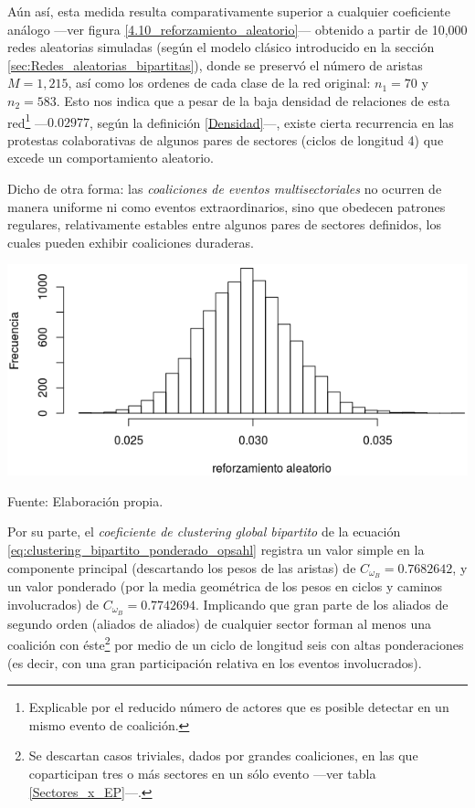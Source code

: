 \documentclass[letterpaper, 11pt]{book}
\theoremstyle{definition}
\theoremstyle{remark}
\begin{document}
Aún así, esta medida resulta comparativamente superior a cualquier coeficiente análogo ---ver figura \ref{4.10_reforzamiento_aleatorio}--- obtenido a partir de 10,000 redes aleatorias simuladas (según el modelo clásico introducido en la sección \ref{sec:Redes_aleatorias_bipartitas}), donde se preservó el número de aristas $M=1,215$, así como los ordenes de cada clase de la red original: $n_{1}=70$ y $n_{2}=583$. 
Esto nos indica que a pesar de la baja densidad de relaciones de esta red\footnote{
    Explicable por el reducido número de actores que es posible detectar en un mismo evento de coalición. 
} 
---$0.02977$, según la definición \ref{Densidad}---, existe cierta recurrencia en las protestas colaborativas de algunos pares de sectores (ciclos de longitud 4) que excede un comportamiento aleatorio. 

Dicho de otra forma: las \emph{coaliciones de eventos multisectoriales} no ocurren de manera uniforme ni como eventos extraordinarios, sino que obedecen patrones regulares, relativamente estables entre algunos pares de sectores definidos, los cuales pueden exhibir coaliciones duraderas.


\hspace{-1em}\begin{minipage}{\linewidth}
\centering
{} \label{4.10_reforzamiento_aleatorio}
\includegraphics[scale=0.72]{img/4.10_reforzamiento_aleatorio.png}
\par\bigskip
\small Fuente: Elaboración propia.
\end{minipage}\bigskip



Por su parte, el \emph{coeficiente de clustering global bipartito} de la ecuación \ref{eq:clustering_bipartito_ponderado_opsahl} registra un valor simple en la componente principal (descartando los pesos de las aristas) de $C_{\omega_B} = 0.7682642$, y un valor ponderado (por la media geométrica de los pesos en ciclos y caminos involucrados) de $C_{\omega_B} = 0.7742694$. 
Implicando que gran parte de los aliados de segundo orden (aliados de aliados) de cualquier sector forman al menos una coalición con éste\footnote{
    Se descartan casos triviales, dados por grandes coaliciones, en las que coparticipan tres o más sectores en un sólo evento ---ver tabla \ref{Sectores_x_EP}---. 
} por medio de un ciclo de longitud seis con altas ponderaciones (es decir, con una gran participación relativa en los eventos involucrados).
\end{document}
